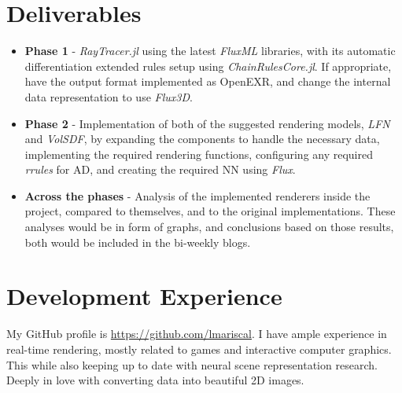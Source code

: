 
\section*{Deliverables}

\begin{itemize}
    \item \textbf{Phase 1} - \textit{RayTracer.jl} using the latest \textit{FluxML} libraries, with its automatic differentiation extended rules setup using \textit{ChainRulesCore.jl}. If appropriate, have the output format implemented as OpenEXR, and change the internal data representation to use \textit{Flux3D}. 
    
    \item \textbf{Phase 2} - Implementation of both of the suggested rendering models, \textit{LFN} and \textit{VolSDF}, by expanding the components to handle the necessary data, implementing the required rendering functions, configuring any required \textit{rrules} for AD, and creating the required NN using \textit{Flux}.
    
    \item \textbf{Across the phases} - Analysis of the implemented renderers inside the project, compared to themselves, and to the original implementations. These analyses would be in form of graphs, and conclusions based on those results, both would be included in the bi-weekly blogs.
\end{itemize}

\pagebreak

\section*{Development Experience}

My GitHub profile is \url{https://github.com/lmariscal}. I have ample experience in real-time rendering, mostly related to games and interactive computer graphics. This while also keeping up to date with neural scene representation research. Deeply in love with converting data into beautiful 2D images.

